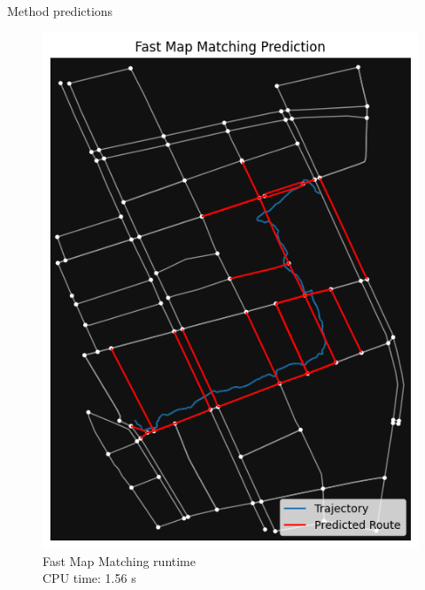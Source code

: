 \documentclass[aspectratio=169, bigfiles, professionalfonts, hyperref={colorlinks=true, allcolors=., urlcolor=blue}]{beamer}
\begin{document}
\begin{frame}{Method predictions}
	\begin{figure}[ht]
\begin{minipage}{0.24\linewidth}
\centering
\includegraphics[width=\textwidth]{fmmprediction.png}
\\\scriptsize{Fast Map Matching runtime\\
CPU time: 1.56 s}
\end{minipage}
\begin{minipage}{0.24\linewidth}
\centering

\end{minipage}
\end{figure}
\end{frame}
\end{document}
